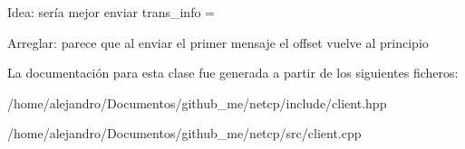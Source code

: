 Idea\+: sería mejor enviar trans\+\_\+info =

Arreglar\+: parece que al enviar el primer mensaje el offset vuelve al principio

La documentación para esta clase fue generada a partir de los siguientes ficheros\+:\begin{DoxyCompactItemize}
\item 
/home/alejandro/\+Documentos/github\+\_\+me/netcp/include/client.\+hpp\item 
/home/alejandro/\+Documentos/github\+\_\+me/netcp/src/client.\+cpp\end{DoxyCompactItemize}
